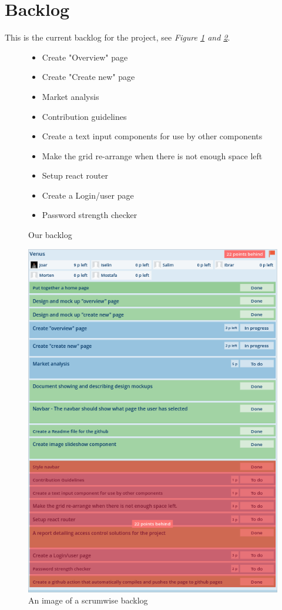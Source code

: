 \documentclass[12pt]{article}
\begin{document}
\section{Backlog}
This is the current backlog for the project, see \textit{Figure \ref{fig:BL} and \ref{fig:BL2}}.
\begin{figure}[h]
    \begin{itemize}
        \item Create "Overview" page
        \item Create "Create new" page
        \item Market analysis
        \item Contribution guidelines
        \item Create a text input components for use by other components
        \item Make the grid re-arrange when there is not enough space left
        \item Setup react router
        \item Create a Login/user page
        \item Password strength checker
    \end{itemize}
    \caption{Our backlog}
    \label{fig:BL}
\end{figure}
\begin{figure}[h]
    \begin{adjustwidth}{-1in}{-1in}
        \centering
        \includegraphics[scale=0.5]{backlog.png}
        \caption{An image of a scrumwise backlog}
        \label{fig:BL2}
    \end{adjustwidth}
\end{figure}
\clearpage
\end{document}

